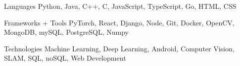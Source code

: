 \documentclass[12pt, letterpaper]{awesome-cv}
\begin{document}
\begin{cvskills}
  \cvskill
    {Languages} %
    {Python, Java, C++, C, JavaScript, TypeScript, Go, HTML, CSS} %

  \cvskill
    {Frameworks + Tools} %
    {PyTorch, React, Django, Node, Git, Docker, OpenCV, MongoDB, mySQL, PostgreSQL, Numpy} %
  
  \cvskill
    {Technologies} %
    {Machine Learning, Deep Learning, Android, Computer Vision, SLAM, SQL, noSQL, Web Development} %
    
\end{cvskills}

\end{document}
